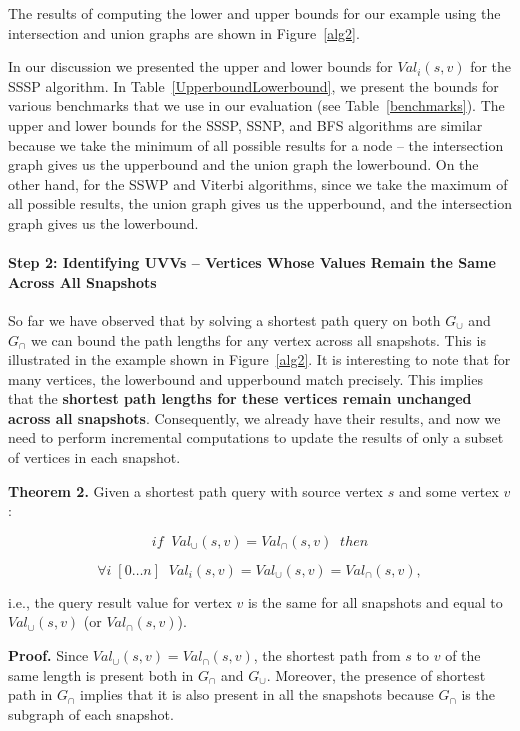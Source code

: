 The results of computing the lower and upper bounds for our example using the intersection and union graphs are shown in Figure~\ref{alg2}. 

In our discussion we presented the upper and lower bounds for $Val_i(s, v)$ for the SSSP algorithm. In Table~\ref{UpperboundLowerbound}, we present the bounds for various benchmarks that we use in our evaluation (see Table~\ref{benchmarks}). The upper and lower bounds for the SSSP, SSNP, and BFS algorithms are similar because we take the minimum of all possible results for a node -- the intersection graph gives us the upperbound and the union graph the lowerbound. On the other hand, for the SSWP and Viterbi algorithms, since we take the maximum of all possible results, the union graph gives us the upperbound, and the intersection graph gives us the lowerbound.


\paragraph{Step 2: Identifying UVVs -- Vertices Whose Values Remain the Same Across All Snapshots} So far we have observed that by solving a shortest path query on both $G_{\cup}$ and $G_{\cap}$ we can bound the path lengths for any vertex across all snapshots. This is illustrated in the example shown in Figure~\ref{alg2}. It is interesting to note that for many vertices, the lowerbound and upperbound match precisely. This implies that the \textbf{shortest path lengths for these vertices remain unchanged across all snapshots}. Consequently, we already have their results, and now we need to perform incremental computations to update the results of only a subset of vertices in each snapshot.

\vspace{0.05in}
\textbf{Theorem 2.} Given a shortest path query with source vertex $s$ and some vertex $v$:

\vspace{-0.15in}
\[ if \;\; Val_\cup(s,v) = Val_\cap(s,v) \;\; then\]

\vspace{-0.25in}
\[ \forall i \;[0\ldots n] \;\; Val_i(s,v) = Val_\cup(s,v) = Val_\cap(s,v), \]

\noindent
i.e., the query result value for vertex $v$ is the same for all snapshots and equal to $Val_\cup(s,v)$ (or $Val_\cap(s,v)$).

\vspace{0.1in}
\textbf{Proof.} Since $Val_\cup(s,v) = Val_\cap(s,v)$, the shortest path from $s$ to $v$ of the same length is present both in $G_\cap$ and $G_\cup$. Moreover, the presence of shortest path in $G_\cap$ implies that it is also present in all the snapshots because $G_\cap$ is the subgraph of each snapshot. 




